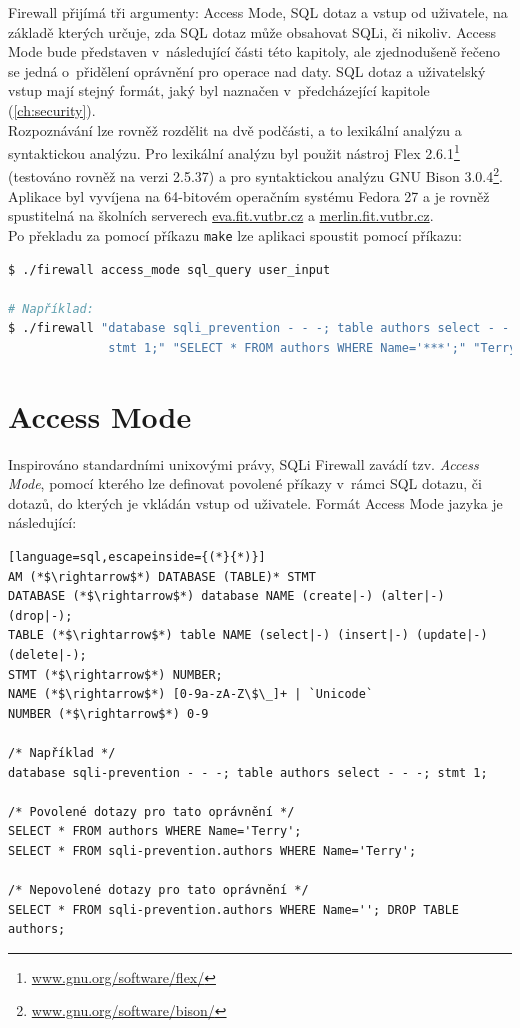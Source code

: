 Firewall přijímá tři argumenty: Access Mode, SQL dotaz a vstup od uživatele, na základě kterých určuje, zda SQL dotaz může obsahovat SQLi, či nikoliv.
Access Mode bude představen v~následující části této kapitoly, ale zjednodušeně řečeno se jedná o~přidělení oprávnění pro operace nad daty. SQL dotaz 
a uživatelský vstup mají stejný formát, jaký byl naznačen v~předcházející kapitole (\ref{ch:security}). \\

Rozpoznávání lze rovněž rozdělit na dvě podčásti, a to lexikální analýzu a syntaktickou analýzu. Pro lexikální analýzu byl použit nástroj 
Flex 2.6.1\footnote{\url{www.gnu.org/software/flex/}} (testováno rovněž na verzi 2.5.37) a pro syntaktickou analýzu 
GNU Bison 3.0.4\footnote{\url{www.gnu.org/software/bison/}}. \\

Aplikace byl vyvíjena na 64-bitovém operačním systému Fedora 27 a je rovněž spustitelná na školních serverech \url{eva.fit.vutbr.cz} 
a \url{merlin.fit.vutbr.cz}. \\

Po překladu za pomocí příkazu \texttt{make} lze aplikaci spoustit pomocí příkazu:

\begin{lstlisting}[language=bash]
$ ./firewall access_mode sql_query user_input

# Například:
$ ./firewall "database sqli_prevention - - -; table authors select - - -; 
              stmt 1;" "SELECT * FROM authors WHERE Name='***';" "Terry"
\end{lstlisting}

\section{Access Mode} \label{sec:6:accessmode}
Inspirováno standardními unixovými právy, SQLi Firewall zavádí tzv. \textit{Access Mode}, pomocí kterého lze definovat
povolené příkazy v~rámci SQL dotazu, či dotazů, do kterých je vkládán vstup od uživatele. Formát Access Mode jazyka je následující:

\begin{lstlisting}[language=sql,escapeinside={(*}{*)}]
AM (*$\rightarrow$*) DATABASE (TABLE)* STMT
DATABASE (*$\rightarrow$*) database NAME (create|-) (alter|-) (drop|-);
TABLE (*$\rightarrow$*) table NAME (select|-) (insert|-) (update|-) (delete|-);
STMT (*$\rightarrow$*) NUMBER;
NAME (*$\rightarrow$*) [0-9a-zA-Z\$\_]+ | `Unicode`
NUMBER (*$\rightarrow$*) 0-9

/* Například */
database sqli-prevention - - -; table authors select - - -; stmt 1;

/* Povolené dotazy pro tato oprávnění */
SELECT * FROM authors WHERE Name='Terry';
SELECT * FROM sqli-prevention.authors WHERE Name='Terry';

/* Nepovolené dotazy pro tato oprávnění */
SELECT * FROM sqli-prevention.authors WHERE Name=''; DROP TABLE authors;
\end{lstlisting}

